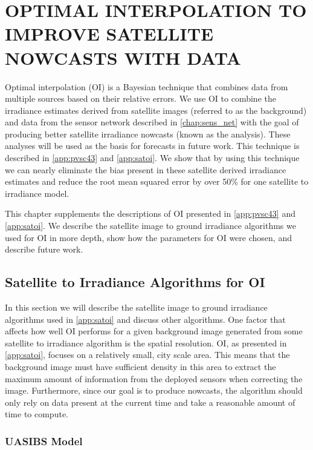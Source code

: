 \chapter{OPTIMAL INTERPOLATION TO IMPROVE SATELLITE NOWCASTS WITH DATA}
\label{chap:satoi}

Optimal interpolation (OI) is a Bayesian technique that combines data
from multiple sources based on their relative errors.
We use OI to combine the irradiance estimates derived from satellite
images (referred to as the background) and data from the sensor
network described in \cref{chap:sens_net} with the goal of producing
better satellite irradiance nowcasts (known as the analysis).
These analyses will be used as the basis for forecasts in future work.
This technique is described in \cref{app:pvsc43} and \cref{app:satoi}.
We show that by using this technique we can nearly eliminate the bias
present in these satellite derived irradiance estimates and reduce the
root mean squared error by over 50\% for one satellite to irradiance
model.

This chapter supplements the descriptions of OI presented in
\cref{app:pvsc43} and \cref{app:satoi}.
We describe the satellite image to ground irradiance algorithms we
used for OI in more depth, show how the parameters for OI were chosen,
and describe future work.

\section{Satellite to Irradiance Algorithms for OI}
In this section we will describe the satellite image to ground
irradiance algorithms used in \cref{app:satoi} and discuss other
algorithms.
One factor that affects how well OI performs for a given background
image generated from some satellite to irradiance algorithm is the
spatial resolution.
OI, as presented in \cref{app:satoi}, focuses on a relatively small,
city scale area.
This means that the background image must have sufficient density in
this area to extract the maximum amount of information from the
deployed sensors when correcting the image.
Furthermore, since our goal is to produce nowcasts, the algorithm
should only rely on data present at the current time and take a
reasonable amount of time to compute.

\subsection{UASIBS Model}

